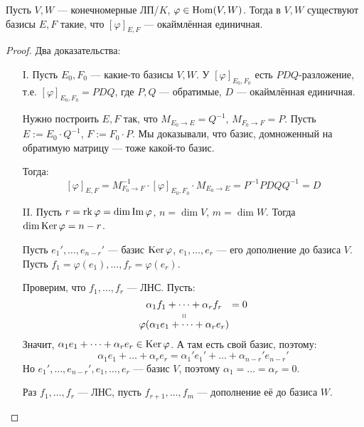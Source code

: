 \begin{theorem}
    Пусть $V, W$ --- конечномерные ЛП/$K$, $\varphi \in \Hom(V, W)$.
    Тогда в $V,W$ существуют базисы $E, F$ такие, что
    $[\varphi]_{E, F}$ --- окаймлённая единичная.
\end{theorem}
\begin{proof} Два доказательства:
    \begin{itemize}
        \item[I.] Пусть $E_0, F_0$ --- какие-то базисы $V,W$.
        У $[\varphi]_{E_0, F_0}$ есть $PDQ$-разложение, т.е.
        $[\varphi]_{E_0, F_0} = PDQ$, где $P, Q$ --- обратимые,
        $D$ --- окаймлённая единичная.  

        Нужно построить $E, F$ так, что $M_{E_0 \to E} = Q^{-1}$,
        $M_{F_0 \to F} = P$. Пусть 
        $E := E_0 \cdot Q^{-1}$, $F := F_0 \cdot P$. 
        Мы доказывали, что базис, домноженный на обратимую матрицу
        --- тоже какой-то базис.
        
        Тогда:
        $$ [\varphi]_{E, F} = M_{F_0 \to F}^{-1} \cdot [\varphi]_{E_0, F_0}
        \cdot M_{E_0 \to E} = P^{-1} PDQ Q^{-1} = D $$

        \item[II.] Пусть $r = \rk \varphi = \dim \Imm \varphi$, 
        $n = \dim V$, $m = \dim W$.
        Тогда $\dim \Ker \varphi = n - r$. 
        
        Пусть $e_1', \dots, e_{n-r}'$ --- базис $\Ker \varphi$,
        $e_1, \dots, e_r$ --- его дополнение до базиса $V$.
        Пусть $f_1 = \varphi(e_1), \dots, f_r = \varphi(e_r)$.

        Проверим, что $f_1, \dots, f_r$ --- ЛНС.
        Пусть:
        $$\stackbelow{\alpha_1 f_1 + \dots + \alpha_r f_r}
        {\varphi(\alpha_1 e_1 + \dots + \alpha_r e_r)} = 0$$
        Значит, $\alpha_1 e_1 + \dots + \alpha_r e_r \in \Ker \varphi$.
        А там есть свой базис, поэтому:
        $$ \alpha_1 e_1 + \dots + \alpha_r e_r =
        \alpha_1' e_1' + \dots + \alpha_{n-r}' e_{n-r}'$$
        Но $e_1', \dots, e_{n-r}', e_1, \dots, e_r$ --- базис $V$,
        поэтому $\alpha_1 = \dots = \alpha_r = 0$.

        Раз $f_1, \dots, f_r$ --- ЛНС, пусть $f_{r+1}, \dots, f_m$ ---
        дополнение её до базиса $W$.


\end{itemize}
\end{proof}
